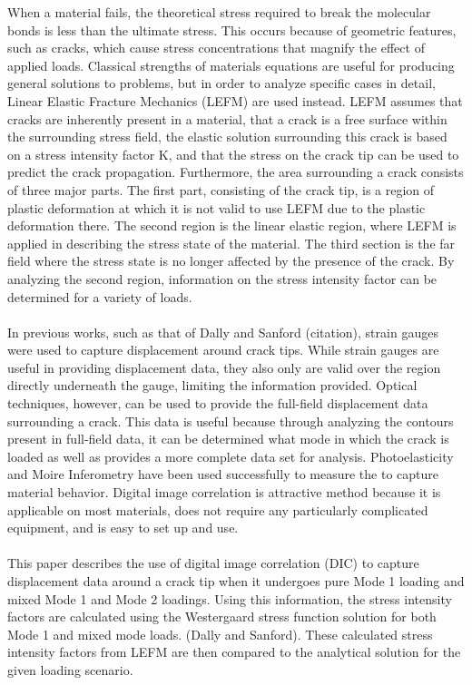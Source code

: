 \documentclass[12pt]{article}
\begin{document}
When a material fails, the theoretical stress required to break the molecular bonds is less than the ultimate stress. This occurs because of geometric features, such as cracks, which cause stress concentrations that magnify the effect of applied loads. Classical strengths of materials equations are useful for producing general solutions to problems, but in order to analyze specific cases in detail, Linear Elastic Fracture Mechanics (LEFM) are used instead. LEFM assumes that cracks are inherently present in a material, that a crack is a free surface within the surrounding stress field, the elastic solution surrounding this crack is based on a stress intensity factor K, and that the stress on the crack tip can be used to predict the crack propagation. Furthermore, the area surrounding a crack consists of three major parts. The first part, consisting of the crack tip, is a region of plastic deformation at which it is not valid to use LEFM due to the plastic deformation there. The second region is the linear elastic region, where LEFM is applied in describing the stress state of the material. The third section is the far field where the stress state is no longer affected by the presence of the crack. By analyzing the second region, information on the stress intensity factor can be determined for a variety of loads.
\\
\\
In previous works, such as that of Dally and Sanford (citation), strain gauges were used to capture displacement around crack tips. While strain gauges are useful in providing displacement data, they also only are valid over the region directly underneath the gauge, limiting the information provided. Optical techniques, however, can be used to provide the full-field displacement data surrounding a crack. This data is useful because through analyzing the contours present in full-field data, it can be determined what mode in which the crack is loaded as well as provides a more complete data set for analysis. Photoelasticity and Moire Inferometry have been used successfully to measure the to capture material behavior. Digital image correlation is attractive method because it is applicable on most materials, does not require any particularly complicated equipment, and is easy to set up and use.
\\
\\
This paper describes the use of digital image correlation (DIC) to capture displacement data around a crack tip when it undergoes pure Mode 1 loading and mixed Mode 1 and Mode 2 loadings. Using this information, the stress intensity factors are calculated using the Westergaard stress function solution for both Mode 1 and mixed mode loads. (Dally and Sanford). These calculated stress intensity factors from LEFM are then compared to the analytical solution for the given loading scenario.
\end{document}
